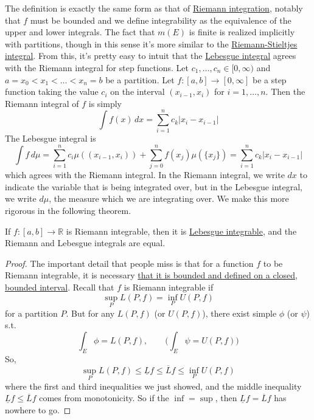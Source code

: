   The definition is exactly the same form as that of \hyperref[real-def:riemann-integral]{Riemann integration}, notably that $f$ must be bounded and we define integrability as the equivalence of the upper and lower integrals. The fact that $m(E)$ is finite is realized implicitly with partitions, though in this sense it's more similar to the \hyperref[real-def:riemann-stieltjes-integral]{Riemann-Stieltjes integral}. From this, it's pretty easy to intuit that the \hyperref[def:leb-int-signed]{Lebesgue integral} agrees with the Riemann integral for step functions. Let $c_1, \ldots, c_n \in [0, \infty)$ and $a = x_0 < x_1 < \ldots < x_n = b$ be a partition. Let $f: [a, b] \to [0, \infty]$ be a step function taking the value $c_i$ on the interval $(x_{i-1}, x_i)$ for $i = 1, \ldots, n$. Then the Riemann integral of $f$ is simply 
  \begin{equation}
    \int f(x) \,dx = \sum_{i=1}^n c_k |x_i - x_{i-1}|
  \end{equation}
  The Lebesgue integral is 
  \begin{equation}
    \int f \, d \mu = \sum_{i=1}^n c_i \mu((x_{i-1}, x_i)) + \sum_{j=0}^n f(x_j) \mu(\{x_j\}) = \sum_{i=1}^n c_k |x_i - x_{i-1}|
  \end{equation}
  which agrees with the Riemann integral. In the Riemann integral, we write $dx$ to indicate the variable that is being integrated over, but in the Lebesgue integral, we write $d \mu$, the measure which we are integrating over. We make this more rigorous in the following theorem.  

  \begin{theorem}
    \label{thm:leb-gen-riem}
    If $f: [a, b] \to \mathbb{R}$ is Riemann integrable, then it is \hyperref[def:leb-int-signed]{Lebesgue integrable}, and the Riemann and Lebesgue integrals are equal. 
  \end{theorem}
  \begin{proof}
    The important detail that people miss is that for a function $f$ to be Riemann integrable, it is necessary \hyperref[real-def:riemann-integral]{that it is bounded and defined on a closed, bounded interval}. Recall that $f$ is Riemann integrable if 
    \begin{equation}
      \sup_P L(P, f) = \inf_P U(P, f)
    \end{equation} 
    for a partition $P$. But for any $L(P, f)$ (or $U(P, f)$), there exist simple $\phi$ (or $\psi$) s.t. 
    \begin{equation}
      \int_E \phi = L(P, f), \qquad \bigg( \int_E \psi = U(P, f) \bigg)
    \end{equation}
    So, 
    \begin{equation}
      \sup_P L(P, f) \leq \underline{L} f \leq \overline{L} f \leq \inf_P U(P, f) 
    \end{equation}
    where the first and third inequalities we just showed, and the middle inequality $\underline{L} f \leq \overline{L} f$ comes from monotonicity. So if the $\inf = \sup$, then $\underline{L} f = \overline{L} f$ has nowhere to go. 
  \end{proof} 

